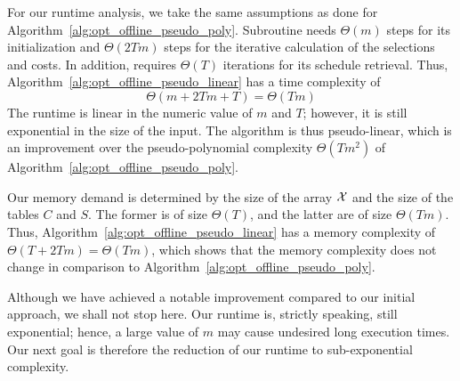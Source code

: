 For our runtime analysis, we take the same assumptions as done for Algorithm~\ref{alg:opt_offline_pseudo_poly}. Subroutine  needs $\Theta(m)$ steps for its initialization and $\Theta(2Tm)$ steps for the iterative calculation of the selections and costs. In addition,  requires $\Theta(T)$ iterations for its schedule retrieval. Thus, Algorithm~\ref{alg:opt_offline_pseudo_linear} has a time complexity of
\begin{equation*}
	\Theta(m+2Tm+T)=\Theta(Tm)
\end{equation*}
The runtime is linear in the numeric value of $m$ and $T$; however, it is still exponential in the size of the input. The algorithm is thus pseudo-linear, which is an improvement over the pseudo-polynomial complexity $\Theta(Tm^2)$ of Algorithm~\ref{alg:opt_offline_pseudo_poly}.

Our memory demand is determined by the size of the array $\mathcal{X}$ and the size of the tables $C$ and $S$. The former is of size $\Theta(T)$, and the latter are of size $\Theta(Tm)$. Thus, Algorithm~\ref{alg:opt_offline_pseudo_linear} has a memory complexity of $\Theta(T+2Tm)=\Theta(Tm)$, which shows that the memory complexity does not change in comparison to Algorithm~\ref{alg:opt_offline_pseudo_poly}.

Although we have achieved a notable improvement compared to our initial approach, we shall not stop here. Our runtime is, strictly speaking, still exponential; hence, a large value of $m$ may cause undesired long execution times. Our next goal is therefore the reduction of our runtime to sub-exponential complexity.
